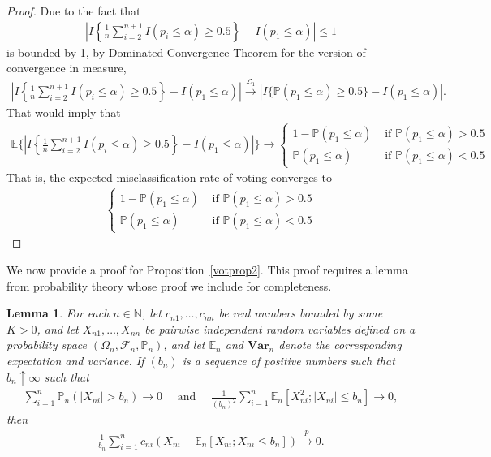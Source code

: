 \documentclass[11pt]{article}
\def\mc#1{\mathcal{#1}} %
\def\E{\mathbb{E}} %
\def\mc#1{\mathcal{#1}}
\def\var#1{\mathrm{Var}(#1)} %
\def\P{\mathbb{P}}
\def\var{\mathbf{Var}}
\def\naturals{\mathbb{N}}
\def\cp{\overset{p}{\to}}
\newtheorem{lem}{Lemma}
\theoremstyle{definition}
\begin{document}
\begin{proof}
Due to the fact that
\begin{align*}
 \left|I\left\{\frac{1}{n}\sum_{i=2}^{n+1}I(p_i \leq  \alpha) \geq 0.5\right\}
  - I( p_1 \leq  \alpha) \right| \leq 1
\end{align*}
is bounded by 1, by Dominated Convergence Theorem for the version of convergence in measure,
\begin{align*}
 \left|I\left\{\frac{1}{n}\sum_{i=2}^{n+1}I(p_i \leq  \alpha) \geq 0.5\right\}
  - I( p_1 \leq  \alpha) \right|
  \stackrel{\mathcal{L}_1}{\rightarrow}  |I\{ \P(p_1 \leq  \alpha) \geq 0.5\}
  - I( p_1 \leq  \alpha) |.
\end{align*}
That would imply that 
\begin{align*}
  \E \bigg\{\left|I\left\{\frac{1}{n}\sum_{i=2}^{n+1}I(p_i \leq  \alpha) \geq 0.5\right\}
  - I( p_1 \leq  \alpha) \right|\bigg\}
  \to  \begin{cases}
    1- \P(p_1 \leq \alpha) & \text{ if } \P(p_1 \leq \alpha) > 0.5 \\
    \P(p_1 \leq \alpha) & \text{ if } \P(p_1 \leq \alpha) < 0.5 
  \end{cases}
\end{align*}
That is, the expected misclassification rate of voting converges to 
\begin{align*}
  \begin{cases}
    1- \P(p_1 \leq \alpha) & \text{ if } \P(p_1 \leq \alpha) > 0.5 \\
    \P(p_1 \leq \alpha) & \text{ if } \P(p_1 \leq \alpha) < 0.5 
  \end{cases}
\end{align*}
\end{proof}


We now provide a proof for Proposition~\ref{votprop2}. This proof requires a lemma from probability theory whose proof we include for completeness.

\begin{lem}
  \label{gwlln}  For each $n\in \naturals$, let $c_{n1}, \ldots, c_{nn}$ be real numbers bounded by some $K > 0$, and let $X_{n1}, \ldots, X_{nn}$ be pairwise independent random variables defined on a probability space $(\Omega_n, \mc{F}_n, \P_n)$, and let $\E_n$ and $\var_n$ denote the corresponding expectation and variance. If $(b_n)$ is a sequence of positive numbers such that $b_n \uparrow \infty$ such that
    \begin{align*}
      \sum_{i=1}^n \P_n (|X_{ni}| > b_n) \to 0
      \quad \text{ and } 
      \quad \frac{1}{(b_n)^2} \sum_{i=1}^n \E_n[X_{ni}^2; |X_{ni}|\leq b_n] \to 0,
    \end{align*}
    then
    \begin{align*}
      \frac{1}{b_n} \sum_{i=1}^n c_{ni} (X_{ni} - \E_n[X_{ni}; X_{ni} \leq b_n]) \cp 0.
    \end{align*}
\end{lem}
\end{document}

